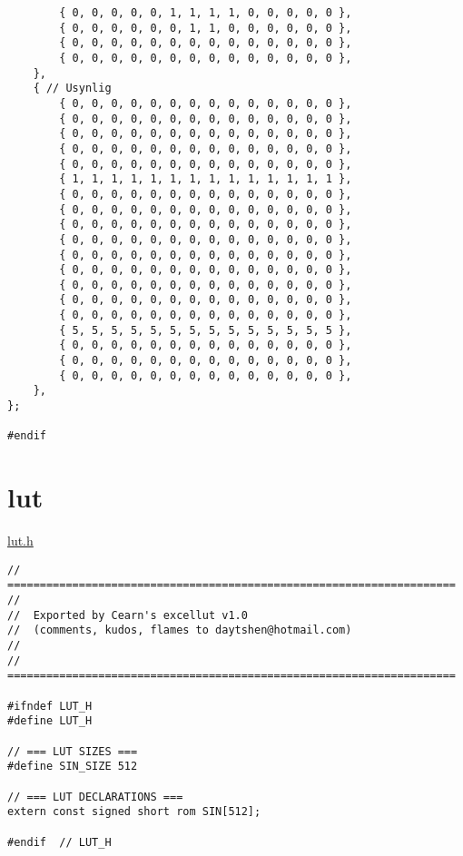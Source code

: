 \begin{lstlisting}
		{ 0, 0, 0, 0, 0, 1, 1, 1, 1, 0, 0, 0, 0, 0 },
		{ 0, 0, 0, 0, 0, 0, 1, 1, 0, 0, 0, 0, 0, 0 },
		{ 0, 0, 0, 0, 0, 0, 0, 0, 0, 0, 0, 0, 0, 0 },
		{ 0, 0, 0, 0, 0, 0, 0, 0, 0, 0, 0, 0, 0, 0 },
	},	
	{ // Usynlig
		{ 0, 0, 0, 0, 0, 0, 0, 0, 0, 0, 0, 0, 0, 0 },
		{ 0, 0, 0, 0, 0, 0, 0, 0, 0, 0, 0, 0, 0, 0 },
		{ 0, 0, 0, 0, 0, 0, 0, 0, 0, 0, 0, 0, 0, 0 },
		{ 0, 0, 0, 0, 0, 0, 0, 0, 0, 0, 0, 0, 0, 0 },
		{ 0, 0, 0, 0, 0, 0, 0, 0, 0, 0, 0, 0, 0, 0 },
		{ 1, 1, 1, 1, 1, 1, 1, 1, 1, 1, 1, 1, 1, 1 },
		{ 0, 0, 0, 0, 0, 0, 0, 0, 0, 0, 0, 0, 0, 0 },
		{ 0, 0, 0, 0, 0, 0, 0, 0, 0, 0, 0, 0, 0, 0 },
		{ 0, 0, 0, 0, 0, 0, 0, 0, 0, 0, 0, 0, 0, 0 },
		{ 0, 0, 0, 0, 0, 0, 0, 0, 0, 0, 0, 0, 0, 0 },
		{ 0, 0, 0, 0, 0, 0, 0, 0, 0, 0, 0, 0, 0, 0 },
		{ 0, 0, 0, 0, 0, 0, 0, 0, 0, 0, 0, 0, 0, 0 },
		{ 0, 0, 0, 0, 0, 0, 0, 0, 0, 0, 0, 0, 0, 0 },
		{ 0, 0, 0, 0, 0, 0, 0, 0, 0, 0, 0, 0, 0, 0 },
		{ 0, 0, 0, 0, 0, 0, 0, 0, 0, 0, 0, 0, 0, 0 },
		{ 5, 5, 5, 5, 5, 5, 5, 5, 5, 5, 5, 5, 5, 5 },
		{ 0, 0, 0, 0, 0, 0, 0, 0, 0, 0, 0, 0, 0, 0 },
		{ 0, 0, 0, 0, 0, 0, 0, 0, 0, 0, 0, 0, 0, 0 },
		{ 0, 0, 0, 0, 0, 0, 0, 0, 0, 0, 0, 0, 0, 0 },
	},
};

#endif
\end{lstlisting}


\section{lut}
\label{lut}

\underline{lut.h}
\begin{lstlisting}
// =====================================================================
//
//	Exported by Cearn's excellut v1.0
//	(comments, kudos, flames to daytshen@hotmail.com)
//
// =====================================================================

#ifndef LUT_H
#define LUT_H

// === LUT SIZES ===
#define SIN_SIZE 512

// === LUT DECLARATIONS ===
extern const signed short rom SIN[512];

#endif	// LUT_H
\end{lstlisting}


